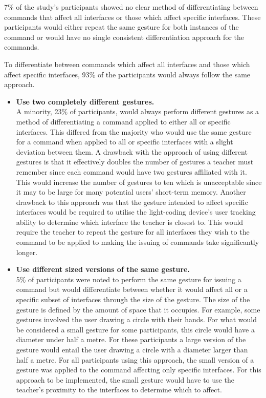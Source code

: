 \documentclass[link]{IWCOMP}
\begin{document}
7\% of the study's participants showed no clear method of differentiating between commands that affect all interfaces or those which affect specific interfaces. 
These participants would either repeat the same gesture for both instances of the command or would have no single consistent differentiation approach for the commands. 

To differentiate between commands which affect all interfaces and those which affect specific interfaces, 93\% of the participants would always follow the same approach.

\begin{itemize}

\item \textbf{Use two completely different gestures.}\\
A minority, 23\% of participants, would always perform different gestures as a method of differentiating a command applied to either all or specific interfaces.
This differed from the majority who would use the same gesture for a command when applied to all or specific interfaces with a slight deviation between them.
A drawback with the approach of using different gestures is that it effectively doubles the number of gestures a teacher must remember since each command would have two gestures affiliated with it.
This would increase the number of gestures to ten which is unacceptable since it may to be large for many potential users' short-term memory.
Another drawback to this approach was that the gesture intended to affect specific interfaces would be required to utilise the light-coding device's user tracking ability to determine which interface the teacher is closest to.
This would require the teacher to repeat the gesture for all interfaces they wish to the command to be applied to making the issuing of commands take significantly longer.

\item \textbf{Use different sized versions of the same gesture.}\\
5\% of participants were noted to perform the same gesture for issuing a command but would differentiate between whether it would affect all or a specific subset of interfaces through the size of the gesture.
The size of the gesture is defined by the amount of space that it occupies.
For example, some gestures involved the user drawing a circle with their hands.
For what would be considered a small gesture for some participants, this circle would have a diameter under half a metre.
For these participants a large version of the gesture would entail the user drawing a circle with a diameter larger than half a metre.
For all participants using this approach, the small version of a gesture was applied to the command affecting only specific interfaces.
For this approach to be implemented, the small gesture would have to use the teacher's proximity to the interfaces to determine which to affect.


\end{itemize}
\end{document}

